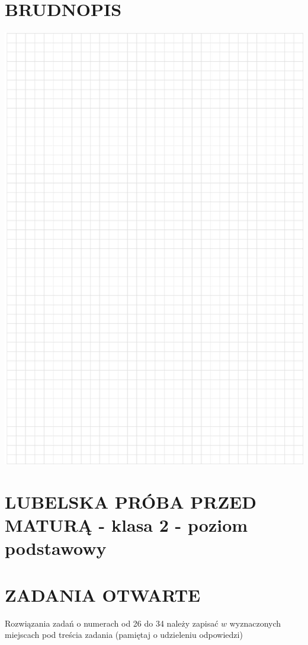 \documentclass[10pt]{article}
\begin{document}
\section*{BRUDNOPIS}
\begin{center}
\includegraphics[max width=\textwidth]{2024_11_21_cce9c7ad32a1dbcd58dag-08}
\end{center}

\section*{LUBELSKA PRÓBA PRZED MATURĄ - klasa 2 - poziom podstawowy}
\section*{ZADANIA OTWARTE}
Rozwiązania zadań o numerach od 26 do 34 należy zapisać \(w\) wyznaczonych miejscach pod treścia zadania (pamiętaj o udzieleniu odpowiedzi)
\end{document}
